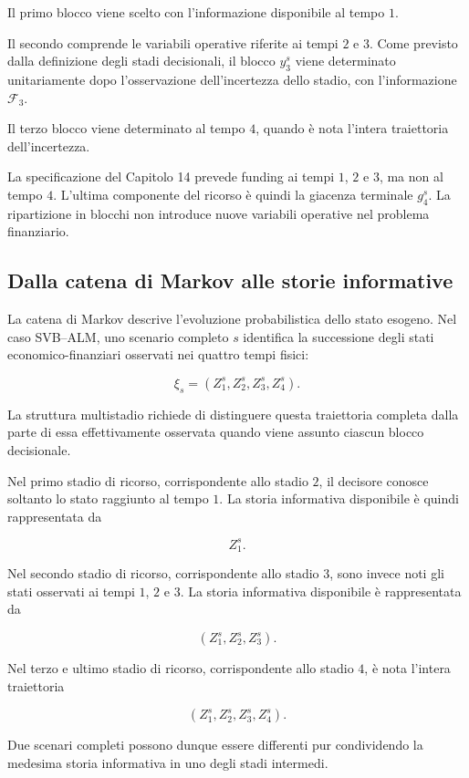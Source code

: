 Il primo blocco viene scelto
con l'informazione disponibile
al tempo $1$.

Il secondo comprende le variabili
operative riferite ai tempi $2$ e $3$.
Come previsto dalla definizione
degli stadi decisionali,
il blocco $y_3^s$ viene determinato
unitariamente dopo l'osservazione
dell'incertezza dello stadio,
con l'informazione $\mathcal F_3$.

Il terzo blocco viene determinato
al tempo $4$, quando \`e nota
l'intera traiettoria dell'incertezza.

La specificazione del Capitolo 14
prevede funding ai tempi $1$, $2$ e $3$,
ma non al tempo $4$. L'ultima
componente del ricorso \`e quindi
la giacenza terminale $g_4^s$.
La ripartizione in blocchi
non introduce nuove variabili
operative nel problema finanziario.



\subsection{Dalla catena di Markov alle storie informative}

La catena di Markov descrive l'evoluzione
probabilistica dello stato esogeno.
Nel caso SVB--ALM, uno scenario completo
$s$ identifica la successione degli stati
economico-finanziari osservati nei quattro
tempi fisici:

\[
\xi_s=(Z_1^s,Z_2^s,Z_3^s,Z_4^s).
\]

La struttura multistadio richiede
di distinguere questa traiettoria completa
dalla parte di essa effettivamente
osservata quando viene assunto
ciascun blocco decisionale.

Nel primo stadio di ricorso,
corrispondente allo stadio $2$,
il decisore conosce soltanto
lo stato raggiunto al tempo $1$.
La storia informativa disponibile
\`{e} quindi rappresentata da

\[
Z_1^s.
\]

Nel secondo stadio di ricorso,
corrispondente allo stadio $3$,
sono invece noti gli stati
osservati ai tempi $1$, $2$ e $3$.
La storia informativa disponibile
\`{e} rappresentata da

\[
(Z_1^s,Z_2^s,Z_3^s).
\]

Nel terzo e ultimo stadio di ricorso,
corrispondente allo stadio $4$,
\`{e} nota l'intera traiettoria

\[
(Z_1^s,Z_2^s,Z_3^s,Z_4^s).
\]

Due scenari completi possono dunque
essere differenti pur condividendo
la medesima storia informativa
in uno degli stadi intermedi.

